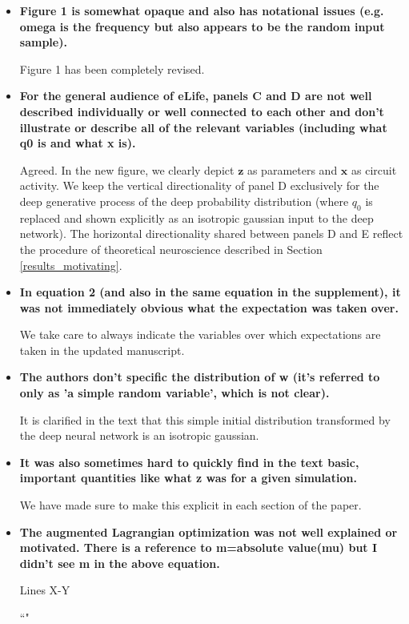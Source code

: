 \documentclass[11pt,a4paper]{article}
\begin{document}
\begin{itemize}
\item \textbf{Figure 1 is somewhat opaque and also has notational issues (e.g. omega is the frequency but also appears to be the random input sample).}

Figure 1 has been completely revised.

\item \textbf{For the general audience of eLife, panels C and D are not well described individually or well connected to each other and don't illustrate or describe all of the relevant variables (including what q0 is and what x is).}

Agreed.  In the new figure, we clearly depict $\mathbf{z}$ as parameters and $\mathbf{x}$ as circuit activity.  
We keep the vertical directionality of panel D exclusively for the deep generative process of the deep probability distribution (where $q_0$ is replaced and shown explicitly as an isotropic gaussian input to the deep network).
The horizontal directionality shared between panels D and E reflect the procedure of theoretical neuroscience described in Section \ref{results_motivating}.

\item \textbf{In equation 2 (and also in the same equation in the supplement), it was not immediately obvious what the expectation was taken over.}

We take care to always indicate the variables over which expectations are taken in the updated manuscript.

\item \textbf{The authors don't specific the distribution of w (it's referred to only as 'a simple random variable', which is not clear).} 

It is clarified in the text that this simple initial distribution transformed by the deep neural network is an isotropic gaussian.

\item \textbf{It was also sometimes hard to quickly find in the text basic, important quantities like what z was for a given simulation.} 

We have made sure to make this explicit in each section of the paper.

\item \textbf{The augmented Lagrangian optimization was not well explained or motivated. There is a reference to m=absolute value(mu) but I didn't see m in the above equation.}

Lines X-Y \\
\begin{displayquote}
``"
\end{displayquote}
 

\end{itemize}
\end{document}
